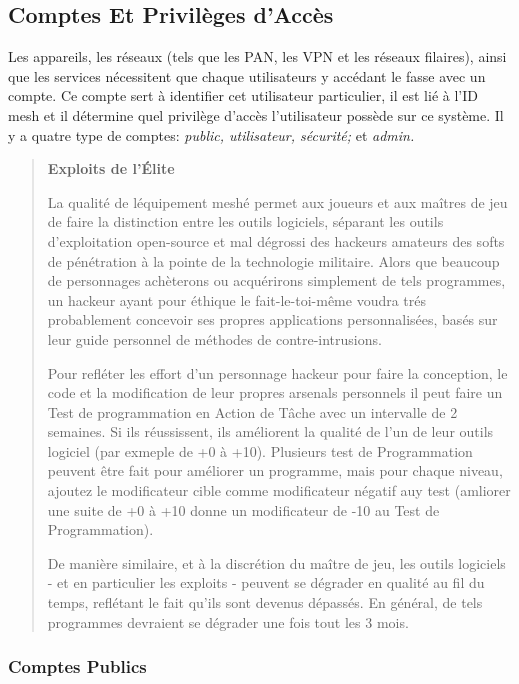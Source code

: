 \subsection{Comptes Et Privilèges d'Accès} 

Les appareils, les réseaux (tels que les PAN, les VPN et les réseaux filaires), ainsi que les services nécessitent que chaque utilisateurs y accédant le fasse avec un compte. Ce compte sert à identifier cet utilisateur particulier, il est lié à l'ID mesh et il détermine quel privilège d'accès l'utilisateur possède sur ce système. Il y a quatre type de comptes: \textit{public, utilisateur, sécurité; } et \textit{admin.} 

\begin{quotation} \textbf{Exploits de l'Élite} 

La qualité de léquipement meshé permet aux joueurs et aux maîtres de jeu de faire la distinction entre les outils logiciels, séparant les outils d'exploitation open-source et mal dégrossi des hackeurs amateurs des softs de pénétration à la pointe de la technologie militaire. Alors que beaucoup de personnages achèterons ou acquérirons simplement de tels programmes, un hackeur ayant pour éthique le fait-le-toi-même voudra trés probablement concevoir ses propres applications personnalisées, basés sur leur guide personnel de méthodes de contre-intrusions. 

Pour refléter les effort d'un personnage hackeur pour faire la conception, le code et la modification de leur propres arsenals personnels il peut faire un Test de programmation en Action de Tâche avec un intervalle de 2 semaines. Si ils réussissent, ils améliorent la qualité de l'un de leur outils logiciel (par exmeple de +0 à +10). Plusieurs test de Programmation peuvent être fait pour améliorer un programme, mais pour chaque niveau, ajoutez le modificateur cible comme modificateur négatif auy test (amliorer une suite de +0 à +10 donne un modificateur de -10 au Test de Programmation). 

De manière similaire, et à la discrétion du maître de jeu, les outils logiciels - et en particulier les exploits - peuvent se dégrader en qualité au fil du temps, reflétant le fait qu'ils sont devenus dépassés. En général, de tels programmes devraient se dégrader une fois tout les 3 mois. \end{quotation} 

\subsubsection{Comptes Publics} 

